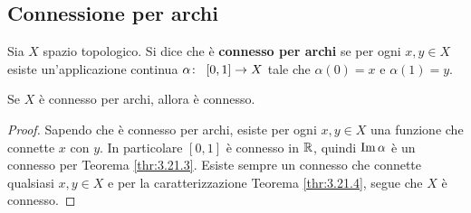 \subsection{\textcolor{TopGener}{\textbf{Connessione per archi}}}



\begin{definition}
	Sia $X$ spazio topologico. Si dice che è \textbf{connesso per archi} se per ogni $x, y \in X$ esiste un'applicazione continua $\alpha \colon\ \left[0,1\right] \rightarrow X$ tale che $\alpha(0)=x$ e $\alpha(1)=y$.
\end{definition} 

\begin{theorem}
	Se $X$ è connesso per archi, allora è connesso.
\end{theorem}
\begin{proof}
	Sapendo che è connesso per archi, esiste per ogni $x,y \in X$ una funzione che connette $x$ con $y$. In particolare $\left[0,1\right]$ è connesso in $\mathbb{R}$, quindi $\operatorname{Im}{\alpha}$ è un connesso per Teorema \ref{thr:3.21.3}. Esiste sempre un connesso che connette qualsiasi $x,y \in X$ e per la caratterizzazione Teorema \ref{thr:3.21.4}, segue che $X$ è connesso.
\end{proof}


